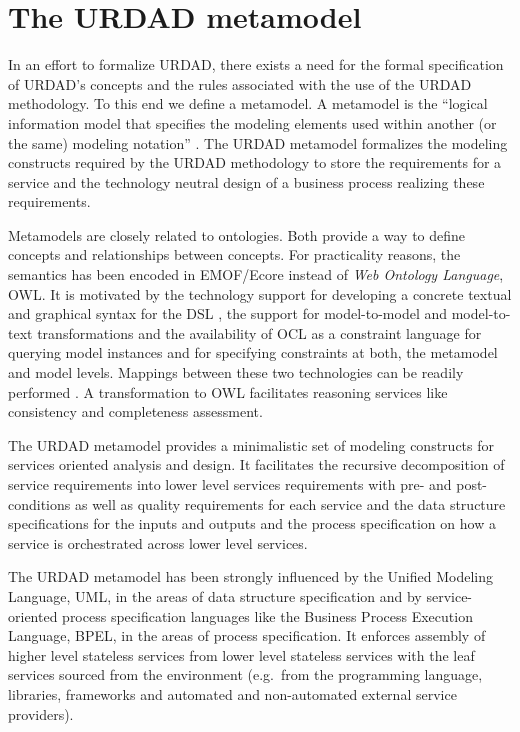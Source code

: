 \section{The URDAD metamodel \label{sec:metamodel}}

In an effort to formalize URDAD, there exists a need for the formal specification of URDAD's concepts and the rules associated with the use of the URDAD methodology. To this end we define a metamodel. A metamodel is the ``logical information model that specifies the modeling elements used within another (or the same) modeling notation'' \cite{_ieee_2003}. The URDAD metamodel formalizes the modeling constructs required by the URDAD methodology to store the requirements for a service and the technology neutral design of a business process realizing these requirements. 

Metamodels are closely related to ontologies. Both provide a way to define concepts and relationships between concepts. For practicality reasons, the semantics has been encoded in EMOF/Ecore instead of {\em Web Ontology Language}, OWL\cite{zuo_zhihong_web_2003}. It is motivated by the technology support for developing a concrete textual and graphical syntax for the DSL \cite{heidenreich_derivation_2009}, the support for model-to-model \cite{_meta_2011} and model-to-text transformations \cite{model2text} and the availability of OCL as a constraint language \cite{OCL} for querying model instances and for specifying constraints at both, the metamodel and model levels. Mappings between these two technologies can be readily performed \cite{staab_model_2010}. A transformation to OWL facilitates reasoning services like consistency and completeness assessment.

The URDAD metamodel provides a minimalistic set of modeling constructs for services oriented analysis and design. It facilitates the recursive decomposition of service requirements into lower level services requirements with pre- and post-conditions as well as quality requirements for each service and the data structure specifications for the inputs and outputs and the process specification on how a service is orchestrated across lower level services.

The URDAD metamodel has been strongly influenced by the Unified Modeling Language, UML, in the areas of data structure specification and by service-oriented process specification languages like the Business Process Execution Language, BPEL, in the areas of process specification. 
It enforces assembly of higher level stateless services from lower level stateless services with the leaf services sourced from the environment (e.g.\ from the programming language, libraries, frameworks and automated and non-automated external service providers). 


